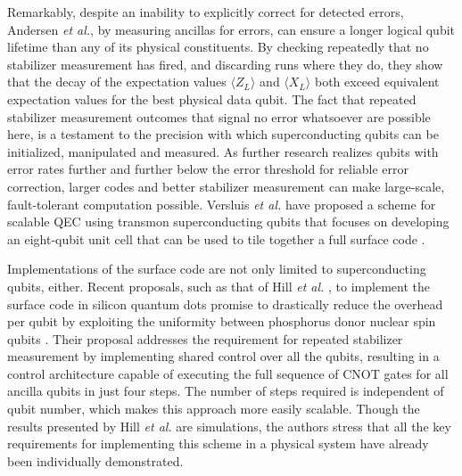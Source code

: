 

Remarkably, despite an inability to explicitly correct for detected errors,
Andersen \textit{et al.}, by measuring ancillas for errors, can ensure a longer
logical qubit lifetime than any of its physical constituents. By checking
repeatedly that no stabilizer measurement has fired, and discarding runs where
they do, they show that the decay of the expectation values $\langle Z_L
\rangle$ and $\langle X_L \rangle$ both exceed equivalent expectation values for
the best physical data qubit. The fact that repeated stabilizer measurement
outcomes that signal no error whatsoever are possible here, is a testament to the
precision with which superconducting qubits can be initialized, manipulated and
measured. As further research realizes qubits with error rates further and
further below the error threshold for reliable error correction, larger codes
and better stabilizer measurement can make large-scale, fault-tolerant
computation possible. Versluis \textit{et al.} have proposed a scheme for
scalable QEC using transmon superconducting qubits that focuses on developing an
eight-qubit unit cell that can be used to tile together a full surface code
\cite{Versluis_2017}.

Implementations of the surface code are not only limited to superconducting
qubits, either. Recent proposals, such as that of Hill \textit{et al.} , to
implement the surface code in silicon quantum dots promise to drastically reduce
the overhead per qubit by exploiting the uniformity between phosphorus donor
nuclear spin qubits \cite{silicon_surface_code}. Their proposal addresses the
requirement for repeated stabilizer measurement by implementing shared control
over all the qubits, resulting in a control architecture capable of executing
the full sequence of CNOT gates for all ancilla qubits in just four steps. The
number of steps required is independent of qubit number, which makes this
approach more easily scalable. Though the results presented by Hill \textit{et
  al.} are simulations, the authors stress that all the key requirements for
implementing this scheme in a physical system have already been individually
demonstrated.

